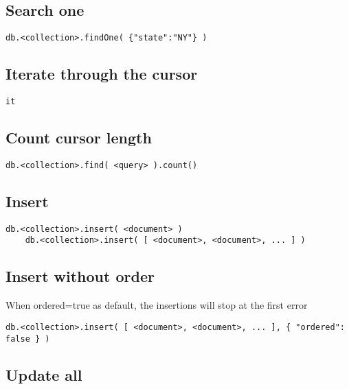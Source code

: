 \documentclass[a4paper]{article}
\begin{document}
\subsection{Search one}

\begin{lstlisting}[style=js]
    db.<collection>.findOne( {"state":"NY"} )
\end{lstlisting}

\subsection{Iterate through the cursor}

\begin{lstlisting}[style=js]
    it
\end{lstlisting}

\subsection{Count cursor length}

\begin{lstlisting}[style=js]
    db.<collection>.find( <query> ).count()
\end{lstlisting}

\subsection{Insert}

\begin{lstlisting}[style=js]
    db.<collection>.insert( <document> )
    db.<collection>.insert( [ <document>, <document>, ... ] )
\end{lstlisting}

\subsection{Insert without order}

When ordered=true as default, the insertions will stop at the first error

\begin{lstlisting}[style=js]
    db.<collection>.insert( [ <document>, <document>, ... ], { "ordered": false } )
\end{lstlisting}

\subsection{Update all}
\end{document}
